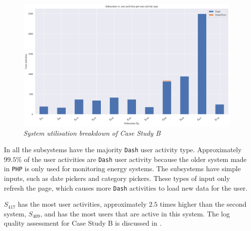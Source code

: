 \clearpage

\begin{figure}[!htb]
	\centering %
	\includegraphics[width=0.95\linewidth]{img/ch3/analysis/case_B_subsystems_1.pdf}
	\caption[System utilisation breakdown of Case Study B]
	{\textit{System utilisation breakdown of Case Study B}}\label{fig:ch3_caseBAnalysis}
\end{figure} 

In  all the subsystems have the majority \texttt{Dash} user activity type. Approximately $99.5\%$ of the user activities are \texttt{Dash} user activity because the older system made in \texttt{PHP} is only used for monitoring energy systems. The subsystems have simple inputs, such as date pickers and category pickers. These types of input only refresh the page, which causes more \texttt{Dash} activities to load new data for the user. \par $S_{417}$ has the most user activities, approximately $2.5$ times higher than the second system, $S_{409}$, and has the most users that are active in this system. The log quality assessment for Case Study B is discussed in .

